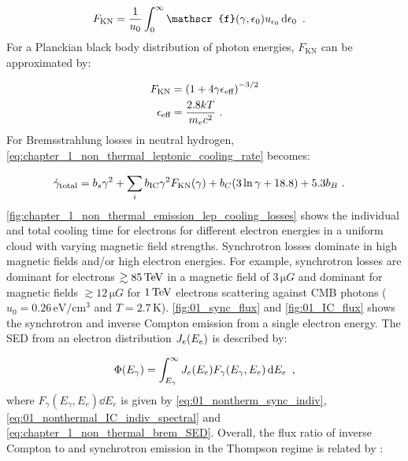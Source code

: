 \begin{equation}
	\begin{split}
		F_\text{KN}&=\frac{1}{u_0}\int_{0}^\infty \mathscr{f}\qty(\gamma,\epsilon_0)u_{\epsilon_0}\dd{\epsilon_0} \text{ .}
	\end{split}
\end{equation}
\noindent For a Planckian black body distribution of photon energies, $F_\text{KN}$ can be approximated by:

\begin{equation}
    \begin{aligned}
    F_\text{KN}&=\qty(1+4\gamma \epsilon_\text{eff})^{-3/2} \\
    \epsilon_\text{eff}&=\frac{2.8kT}{m_ec^2}\text{ .}
    \end{aligned}
\end{equation}
\noindent For Bremsstrahlung losses in neutral hydrogen, \autoref{eq:chapter_1_non_thermal_leptonic_cooling_rate} becomes:

\begin{equation}
    \begin{aligned}
    \dot{\gamma}_\text{total}&=b_s\gamma^2+\sum_{i} b_\text{IC}\gamma^2F_\text{KN}\qty(\gamma)+b_C\qty(3\ln \gamma+18.8)+5.3b_B \text{ .}
    \end{aligned} \label{eq:chapter_1_non_thermal_leptonic_cooling_rate2}
\end{equation}
\noindent \autoref{fig:chapter_1_non_thermal_emission_lep_cooling_losses} shows the individual and total cooling time for electrons for different electron energies in a uniform cloud with varying magnetic field strengths. Synchrotron losses dominate in high magnetic fields and/or high electron energies. For example, synchrotron losses are dominant for electrons $\gtrsim 85\,\TeV$ in a magnetic field of $3\,\si{\micro G}$ and dominant for magnetic fields $\gtrsim 12\,\si{\micro G}$ for $1\,\TeV$ electrons scattering against CMB photons ($u_0=0.26\,\si{\electronvolt\per\centi\meter\cubed}$ and $T=2.7\,\si{\kelvin}$). 
\newpar 
\autoref{fig:01_sync_flux} and \autoref{fig:01_IC_flux} shows the synchrotron and inverse Compton emission from a single electron energy. The SED from an electron distribution $J_e\qty(E_e)$ is described by:

\begin{equation}
    \begin{aligned}
        \Phi\qty(E_\gamma)= \int_{E_\gamma}^\infty J_e\qty(E_e) F_\gamma(E_\gamma,E_e)\dd{E_e}\text{ ,}
    \end{aligned} \label{eq:01_non_thermal_leptonic_total}
\end{equation}
\noindent where $F_\gamma(E_\gamma,E_e)\dd{E_e}$ is given by \autoref{eq:01_nontherm_sync_indiv}, \autoref{eq:01_nonthermal_IC_indiv_spectral} and \autoref{eq:chapter_1_non_thermal_brem_SED}. Overall, the flux ratio of inverse Compton to and synchrotron emission in the Thompson regime is related by \citep{1997MNRAS.291..162A}:

